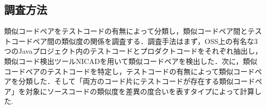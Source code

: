 \documentclass{fose2019}           %
\begin{document}
\subsection{調査方法}
類似コードペアをテストコードの有無によって分類し，類似コードペア間とテストコードペア間の類似度の関係を調査する．調査手法はまず，OSS上の有名な3つのJavaプロジェクト内のテストコードとプロダクトコードをそれぞれ抽出し，類似コード検出ツールNICADを用いて類似コードペアを検出した\cite{ICPC}．次に，類似コードペアのテストコードを特定し，テストコードの有無によって類似コードペアを分類した．そして「両方のコード片にテストコードが存在する類似コードペア」を対象にソースコードの類似度を差異の度合いを表すタイプによって計算した\cite{SCP}.

\end{document}
